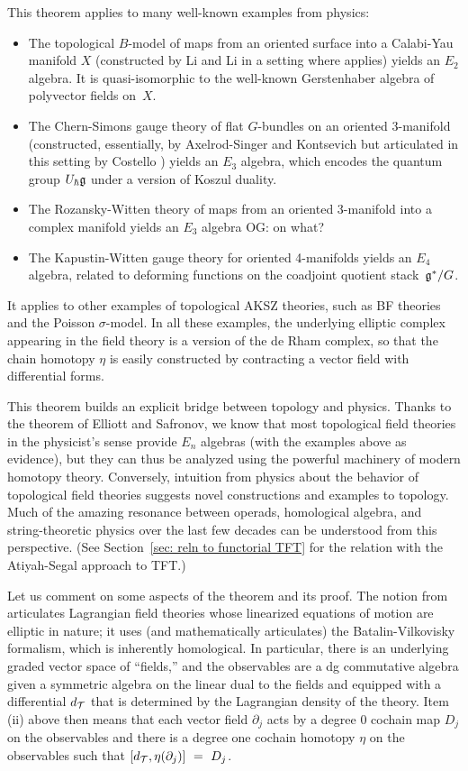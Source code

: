 \documentclass[11pt]{amsart}
\def\owen#1{{\textcolor{violet!50!black}{OG: {#1}}}}
\begin{document}
This theorem applies to many well-known examples from physics:
\begin{itemize}
\item The topological $B$-model of maps from an oriented surface into a Calabi-Yau manifold $X$ (constructed by Li and Li \cite{LiLi} in a setting where \cite{EllSaf} applies) yields an $E_2$ algebra. It is quasi-isomorphic to the well-known Gerstenhaber algebra of polyvector fields on~$X$.
\item The Chern-Simons gauge theory of flat $G$-bundles on an oriented 3-manifold (constructed, essentially, by Axelrod-Singer \cite{AxeSin} and Kontsevich \cite{KonECM} but articulated in this setting by Costello \cite{CosBook}) yields an $E_3$ algebra, which encodes the quantum group $U_\hbar \mathfrak g$ under a version of Koszul duality.
\item The Rozansky-Witten theory of maps from an oriented 3-manifold into a complex manifold \cite{ChanLeungLi} yields an $E_3$ algebra \owen{on what?}
\item The Kapustin-Witten gauge theory for oriented 4-manifolds \cite{EGW} yields an $E_4$ algebra, related to deforming functions on the coadjoint quotient stack~$\mathfrak g^*/G$.
\end{itemize}
It applies to other examples of topological AKSZ theories, such as BF theories and the Poisson $\sigma$-model.
In all these examples, the underlying elliptic complex appearing in the field theory is a version of the de Rham complex,
so that the chain homotopy $\eta$ is easily constructed by contracting a vector field with differential forms.

This theorem builds an explicit bridge between topology and physics. 
Thanks to the theorem of Elliott and Safronov, we know that most topological field theories in the physicist's sense provide $E_n$ algebras (with the examples above as evidence),
but they can thus be analyzed using the powerful machinery of modern homotopy theory. 
Conversely, intuition from physics about the behavior of topological field theories suggests novel constructions and examples to topology. 
Much of the amazing resonance between operads, homological algebra, and string-theoretic physics over the last few decades can be understood from this perspective.
(See Section~\ref{sec: reln to functorial TFT} for the relation with the Atiyah-Segal approach to TFT.)

Let us comment on some aspects of the theorem and its proof.
The notion from \cite{CosBook} articulates Lagrangian field theories whose linearized equations of motion are elliptic in nature;
it uses (and mathematically articulates) the Batalin-Vilkovisky formalism,
which is inherently homological.
In particular, there is an underlying graded vector space of ``fields,''
and the observables are a dg commutative algebra given a symmetric algebra on the linear dual to the fields and equipped with a differential $d_\mathcal T$ that is determined by the Lagrangian density of the theory.
Item (ii) above then means that each vector field $\partial_j$ acts by a degree 0 cochain map $D_j$ on the observables and there is a degree one cochain homotopy $\eta$ on the observables such that $[d_\mathcal T, \eta(\partial_j)]~=~D_j$.
\end{document}
